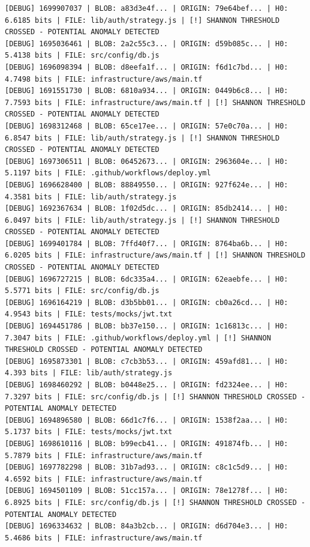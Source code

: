 \documentclass[12pt, a4paper, oneside]{report}
\begin{document}
\newpage
\begin{lstlisting}[basicstyle=\tiny\ttfamily]
[DEBUG] 1699907037 | BLOB: a83d3e4f... | ORIGIN: 79e64bef... | H0: 6.6185 bits | FILE: lib/auth/strategy.js | [!] SHANNON THRESHOLD CROSSED - POTENTIAL ANOMALY DETECTED
[DEBUG] 1695036461 | BLOB: 2a2c55c3... | ORIGIN: d59b085c... | H0: 5.4138 bits | FILE: src/config/db.js
[DEBUG] 1696098394 | BLOB: d8eefa1f... | ORIGIN: f6d1c7bd... | H0: 4.7498 bits | FILE: infrastructure/aws/main.tf
[DEBUG] 1691551730 | BLOB: 6810a934... | ORIGIN: 0449b6c8... | H0: 7.7593 bits | FILE: infrastructure/aws/main.tf | [!] SHANNON THRESHOLD CROSSED - POTENTIAL ANOMALY DETECTED
[DEBUG] 1698312468 | BLOB: 65ce17ee... | ORIGIN: 57e0c70a... | H0: 6.8547 bits | FILE: lib/auth/strategy.js | [!] SHANNON THRESHOLD CROSSED - POTENTIAL ANOMALY DETECTED
[DEBUG] 1697306511 | BLOB: 06452673... | ORIGIN: 2963604e... | H0: 5.1197 bits | FILE: .github/workflows/deploy.yml
[DEBUG] 1696628400 | BLOB: 88849550... | ORIGIN: 927f624e... | H0: 4.3581 bits | FILE: lib/auth/strategy.js
[DEBUG] 1692367634 | BLOB: 1f02d5dc... | ORIGIN: 85db2414... | H0: 6.0497 bits | FILE: lib/auth/strategy.js | [!] SHANNON THRESHOLD CROSSED - POTENTIAL ANOMALY DETECTED
[DEBUG] 1699401784 | BLOB: 7ffd40f7... | ORIGIN: 8764ba6b... | H0: 6.0205 bits | FILE: infrastructure/aws/main.tf | [!] SHANNON THRESHOLD CROSSED - POTENTIAL ANOMALY DETECTED
[DEBUG] 1696727215 | BLOB: 6dc335a4... | ORIGIN: 62eaebfe... | H0: 5.5771 bits | FILE: src/config/db.js
[DEBUG] 1696164219 | BLOB: d3b5bb01... | ORIGIN: cb0a26cd... | H0: 4.9543 bits | FILE: tests/mocks/jwt.txt
[DEBUG] 1694451786 | BLOB: bb37e150... | ORIGIN: 1c16813c... | H0: 7.3047 bits | FILE: .github/workflows/deploy.yml | [!] SHANNON THRESHOLD CROSSED - POTENTIAL ANOMALY DETECTED
[DEBUG] 1695873301 | BLOB: c7cb3b53... | ORIGIN: 459afd81... | H0: 4.393 bits | FILE: lib/auth/strategy.js
[DEBUG] 1698460292 | BLOB: b0448e25... | ORIGIN: fd2324ee... | H0: 7.3297 bits | FILE: src/config/db.js | [!] SHANNON THRESHOLD CROSSED - POTENTIAL ANOMALY DETECTED
[DEBUG] 1694896580 | BLOB: 66d1c7f6... | ORIGIN: 1538f2aa... | H0: 5.1737 bits | FILE: tests/mocks/jwt.txt
[DEBUG] 1698610116 | BLOB: b99ecb41... | ORIGIN: 491874fb... | H0: 5.7879 bits | FILE: infrastructure/aws/main.tf
[DEBUG] 1697782298 | BLOB: 31b7ad93... | ORIGIN: c8c1c5d9... | H0: 4.6592 bits | FILE: infrastructure/aws/main.tf
[DEBUG] 1694501109 | BLOB: 51cc157a... | ORIGIN: 78e1278f... | H0: 6.8925 bits | FILE: src/config/db.js | [!] SHANNON THRESHOLD CROSSED - POTENTIAL ANOMALY DETECTED
[DEBUG] 1696334632 | BLOB: 84a3b2cb... | ORIGIN: d6d704e3... | H0: 5.4686 bits | FILE: infrastructure/aws/main.tf

\end{lstlisting}
\end{document}
